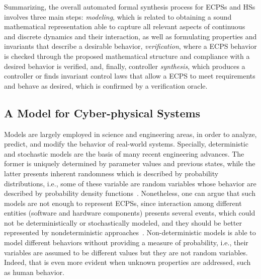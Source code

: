 \documentclass{cta-author}
\begin{document}
{Summarizing, the overall automated formal synthesis process for ECPSs and HSs involves three main steps: \textit{modeling}, which is related to obtaining a sound mathematical representation able to capture all relevant aspects of continuous and discrete dynamics and their interaction, as well as formulating properties and invariants that describe a desirable behavior, \textit{verification}, where a ECPS behavior is checked through the proposed mathematical structure and compliance with a desired behavior is verified, and, finally, controller \textit{synthesis}, which produces a controller or finds invariant control laws that allow a ECPS to meet requirements and behave as desired, which is confirmed by a verification oracle. 


}



\subsection{A Model for Cyber-physical Systems}
\label{ssec:model}
{
\color{blue}

Models are largely employed in science and engineering areas, in order to analyze, predict, and modify the behavior of real-world systems. Specially, deterministic and stochastic models are the basis of many recent engineering advances. The former is uniquely determined by parameter values and previous states, while the latter presents inherent randomness which is described by probability distributions, i.e., some of these variable are random variables whose behavior are described by probability density functions~\cite{stochmodel}. Nonetheless, one can argue that such models are not enough to represent ECPSs, since interaction among different entities (software and hardware components) presents several events, which could not be deterministically or stochastically modeled, and they should be better represented by nondeterministic approaches~\cite{leeCPS2}. Non-deterministic models is able to model different behaviors without providing a measure of probability, i.e., their variables are assumed to be different values but they are not random variables. Indeed, that is even more evident when unknown properties are addressed, such as human behavior.
}
\end{document}
